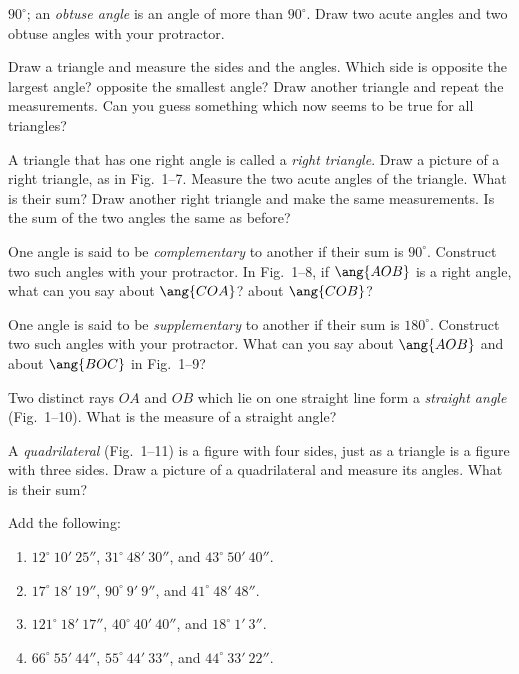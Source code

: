 \documentclass[11pt]{book}
\theoremstyle{bkplain}
\theoremstyle{XIplainnote}
\theoremstyle{bkplain}
\theoremstyle{bkplain}
\begin{document}
\begin{exercisecols}
\begin{exlist}
      $90^\circ$; an \emph{obtuse angle} is an angle of more than $90^\circ$.
      Draw two acute angles and two obtuse angles with your protractor.
\exfig{\FIGISIX}
\item Draw a triangle and measure the sides and the angles. Which side is
      opposite the largest angle? opposite the smallest angle? Draw another
      triangle and repeat the measurements. Can you guess something which now
      seems to be true for all triangles?
\item A triangle that has one right angle is called a \emph{right triangle}. Draw
      a picture of a right triangle, as in Fig.~1--7. Measure the two acute
      angles of the triangle. What is their sum? Draw another right triangle and
      make the same measurements. Is the sum of the two angles the same as
      before?
\exfig{\FIGISEVEN}
\item One angle is said to be \emph{complementary} to another if their sum is
      $90^\circ$. Construct two such angles with your protractor. In Fig.~1--8,
      if $\ang{AOB}$ is a right angle, what can you say about $\ang{COA}$? about
      $\ang{COB}$?
\exfig{\FIGIEIGHT}
\item One angle is said to be \emph{supplementary} to another if their sum is
      $180^\circ$. Construct two such angles with your protractor. What can you
      say about $\ang{AOB}$ and about $\ang{BOC}$ in Fig.~1--9?
\exfig{\FIGININE}
\item Two distinct rays $OA$ and $OB$ which lie on one straight line form a
      \emph{straight angle} (Fig.~1--10). What is the measure of a straight
      angle?
\exfig{\FIGITEN}
\item A \emph{quadrilateral} (Fig.~1--11) is a figure with four sides, just as a
      triangle is a figure with three sides. Draw a picture of a quadrilateral and
      measure its angles. What is their sum?
\exfig{\FIGIELEVEN}
\item Add the following:
  \begin{enumerate}[label=(\alph*), leftmargin=1.9em, itemsep=1pt, topsep=2pt]
  \item $12^\circ\ 10'\ 25''$, $31^\circ\ 48'\ 30''$, and $43^\circ\ 50'\ 40''$.
  \item $17^\circ\ 18'\ 19''$, $90^\circ\ 9'\ 9''$, and $41^\circ\ 48'\ 48''$.
  \item $121^\circ\ 18'\ 17''$, $40^\circ\ 40'\ 40''$, and $18^\circ\ 1'\ 3''$.
  \item $66^\circ\ 55'\ 44''$, $55^\circ\ 44'\ 33''$, and $44^\circ\ 33'\ 22''$.

\end{enumerate}
\end{exlist}
\end{exercisecols}
\end{document}
